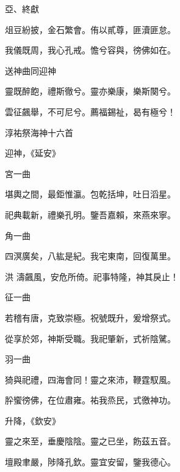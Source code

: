 \begin{pinyinscope}
 亞、終獻



 俎豆紛披，金石繁會。侑以貳尊，匪瀆匪怠。



 我儀既周，我心孔戒。憺兮容與，徬佛如在。



 送神曲同迎神



 靈既醉飽，禮斯徹兮。靈亦樂康，樂斯闋兮。



 雲征飆舉，不可尼兮。薦福錫祉，曷有極兮！



 淳祐祭海神十六首



 迎神，《延安》



 宮一曲



 堪輿之間，最鉅惟瀛。包乾括坤，吐日滔星。



 祀典載新，禮樂孔明。鑒吾嘉賴，來燕來寧。



 角一曲



 四溟廣矣，八紘是紀。我宅東南，回復萬里。



 洪
 濤飆風，安危所倚。祀事特隆，神其戾止！



 征一曲



 若稽有唐，克致崇極。祝號既升，爰增祭式。



 從享於郊，神斯受職。我祀肇新，式祈陰騭。



 羽一曲



 猗與祀禮，四海會同！靈之來沛，鞭霆馭風。



 肸蠁徬佛，在位肅雍。祐我烝民，式徼神功。



 升降，《欽安》



 靈之來至，垂慶陰陰。靈之已坐，飭茲五音。



 壇殿聿嚴，陟降孔欽。靈宜安留，鑒我德心。




\end{pinyinscope}

